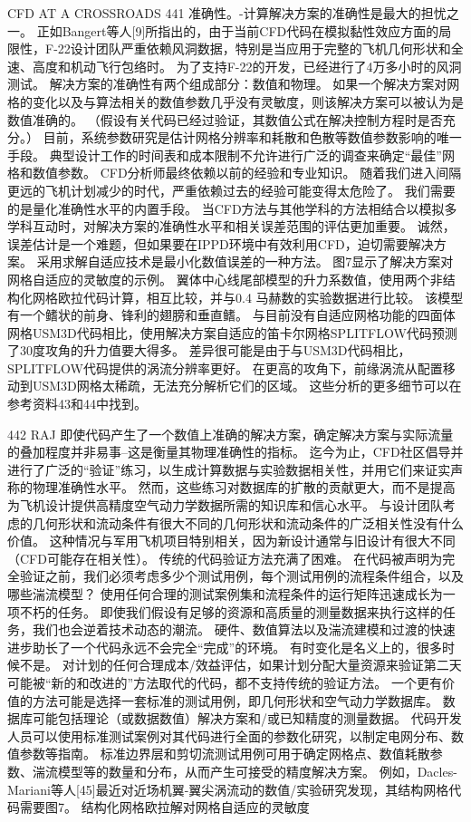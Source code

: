 \documentclass[UTF8,11pt,a4paper,openany,fontset=fandol]{ctexbook}
\begin{document}
CFD AT A CROSSROADS 441 准确性。-计算解决方案的准确性是最大的担忧之一。 正如Bangert等人[9]所指出的，由于当前CFD代码在模拟黏性效应方面的局限性，F-22设计团队严重依赖风洞数据，特别是当应用于完整的飞机几何形状和全速、高度和机动飞行包络时。 为了支持F-22的开发，已经进行了4万多小时的风洞测试。 解决方案的准确性有两个组成部分：数值和物理。 如果一个解决方案对网格的变化以及与算法相关的数值参数几乎没有灵敏度，则该解决方案可以被认为是数值准确的。 （假设有关代码已经过验证，其数值公式在解决控制方程时是否充分。） 目前，系统参数研究是估计网格分辨率和耗散和色散等数值参数影响的唯一手段。 典型设计工作的时间表和成本限制不允许进行广泛的调查来确定“最佳”网格和数值参数。 CFD分析师最终依赖以前的经验和专业知识。 随着我们进入间隔更远的飞机计划减少的时代，严重依赖过去的经验可能变得太危险了。 我们需要的是量化准确性水平的内置手段。 当CFD方法与其他学科的方法相结合以模拟多学科互动时，对解决方案的准确性水平和相关误差范围的评估更加重要。 诚然，误差估计是一个难题，但如果要在IPPD环境中有效利用CFD，迫切需要解决方案。 采用求解自适应技术是最小化数值误差的一种方法。 图7显示了解决方案对网格自适应的灵敏度的示例。 翼体中心线尾部模型的升力系数值，使用两个非结构化网格欧拉代码计算，相互比较，并与0.4 马赫数的实验数据进行比较。 该模型有一个鳍状的前身、锋利的翅膀和垂直鳍。 与目前没有自适应网格功能的四面体网格USM3D代码相比，使用解决方案自适应的笛卡尔网格SPLITFLOW代码预测了30度攻角的升力值要大得多。 差异很可能是由于与USM3D代码相比，SPLITFLOW代码提供的涡流分辨率更好。 在更高的攻角下，前缘涡流从配置移动到USM3D网格太稀疏，无法充分解析它们的区域。 这些分析的更多细节可以在参考资料43和44中找到。

442 RAJ 即使代码产生了一个数值上准确的解决方案，确定解决方案与实际流量的叠加程度并非易事--这是衡量其物理准确性的指标。 迄今为止，CFD社区倡导并进行了广泛的“验证”练习，以生成计算数据与实验数据相关性，并用它们来证实声称的物理准确性水平。 然而，这些练习对数据库的扩散的贡献更大，而不是提高为飞机设计提供高精度空气动力学数据所需的知识库和信心水平。 与设计团队考虑的几何形状和流动条件有很大不同的几何形状和流动条件的广泛相关性没有什么价值。 这种情况与军用飞机项目特别相关，因为新设计通常与旧设计有很大不同（CFD可能存在相关性）。 传统的代码验证方法充满了困难。 在代码被声明为完全验证之前，我们必须考虑多少个测试用例，每个测试用例的流程条件组合，以及哪些湍流模型？ 使用任何合理的测试案例集和流程条件的运行矩阵迅速成长为一项不朽的任务。 即使我们假设有足够的资源和高质量的测量数据来执行这样的任务，我们也会逆着技术动态的潮流。 硬件、数值算法以及湍流建模和过渡的快速进步助长了一个代码永远不会完全“完成”的环境。 有时变化是名义上的，很多时候不是。 对计划的任何合理成本/效益评估，如果计划分配大量资源来验证第二天可能被“新的和改进的”方法取代的代码，都不支持传统的验证方法。 一个更有价值的方法可能是选择一套标准的测试用例，即几何形状和空气动力学数据库。 数据库可能包括理论（或数据数值）解决方案和/或已知精度的测量数据。 代码开发人员可以使用标准测试案例对其代码进行全面的参数化研究，以制定电网分布、数值参数等指南。 标准边界层和剪切流测试用例可用于确定网格点、数值耗散参数、湍流模型等的数量和分布，从而产生可接受的精度解决方案。 例如，Dacles-Mariani等人[45]最近对近场机翼-翼尖涡流动的数值/实验研究发现，其结构网格代码需要图7。 结构化网格欧拉解对网格自适应的灵敏度
\end{document}
